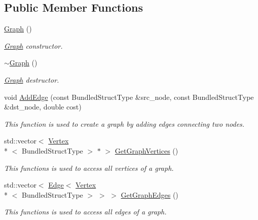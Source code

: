 \subsection*{Public Member Functions}
\begin{DoxyCompactItemize}
\item 
\hyperlink{classsrcl__ctrl_1_1Graph_a0899e8a7a595c50ebd6e33af77be4658}{Graph} ()
\begin{DoxyCompactList}\small\item\em \hyperlink{classsrcl__ctrl_1_1Graph}{Graph} constructor. \end{DoxyCompactList}\item 
\hyperlink{classsrcl__ctrl_1_1Graph_af3e550a78cd615839f10369e9cdd3141}{$\sim$\-Graph} ()
\begin{DoxyCompactList}\small\item\em \hyperlink{classsrcl__ctrl_1_1Graph}{Graph} destructor. \end{DoxyCompactList}\item 
void \hyperlink{classsrcl__ctrl_1_1Graph_ad49ef1a9501f2c58d3cacb5a5c3ca7f1}{Add\-Edge} (const Bundled\-Struct\-Type \&src\-\_\-node, const Bundled\-Struct\-Type \&dst\-\_\-node, double cost)
\begin{DoxyCompactList}\small\item\em This function is used to create a graph by adding edges connecting two nodes. \end{DoxyCompactList}\item 
std\-::vector$<$ \hyperlink{classsrcl__ctrl_1_1Vertex}{Vertex}\\*
$<$ Bundled\-Struct\-Type $>$ $\ast$ $>$ \hyperlink{classsrcl__ctrl_1_1Graph_aff39367003a9f9f5e87c14342b0a5307}{Get\-Graph\-Vertices} ()
\begin{DoxyCompactList}\small\item\em This functions is used to access all vertices of a graph. \end{DoxyCompactList}\item 
std\-::vector$<$ \hyperlink{classsrcl__ctrl_1_1Edge}{Edge}$<$ \hyperlink{classsrcl__ctrl_1_1Vertex}{Vertex}\\*
$<$ Bundled\-Struct\-Type $>$ $>$ $>$ \hyperlink{classsrcl__ctrl_1_1Graph_aeaa992f45305eb658c4fef18d1050064}{Get\-Graph\-Edges} ()
\begin{DoxyCompactList}\small\item\em This functions is used to access all edges of a graph. \end{DoxyCompactList}\item 

\end{DoxyCompactItemize}
